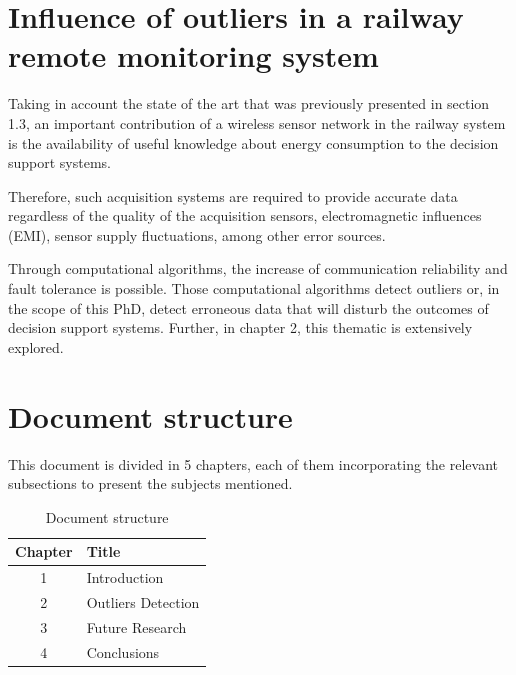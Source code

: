 \section{Influence of outliers in a railway remote monitoring system}

Taking in account the state of the art that was previously presented in section 1.3, an important contribution of a wireless sensor network in the railway system is the availability of useful knowledge about energy consumption to the decision support systems.

Therefore, such acquisition systems are required to provide accurate data regardless of the quality of the acquisition sensors, electromagnetic influences (EMI), sensor supply fluctuations, among other error sources.

Through computational algorithms, the increase of communication reliability and fault tolerance is possible. Those computational algorithms detect outliers or, in the scope of this PhD, detect erroneous data that will disturb the outcomes of decision support systems. Further, in chapter 2, this thematic is extensively explored.

\section{Document structure}

This document is divided in 5 chapters, each of them incorporating the relevant subsections to present the subjects mentioned. 

\begin{table}[!h]
    \label{tb:struct}
    \centering
    \caption{Document structure}
    \vspace{0.2em}
    \begin{tabular}{c|l}%
    \textbf{Chapter} & \textbf{Title}                    \\ \hline
    1       &                   Introduction             \\ \hline
    2       &                   Outliers Detection    \\ \hline
    3       &                   Future Research    \\ \hline
    4       &                   Conclusions               \\
    \end{tabular}
\end{table}